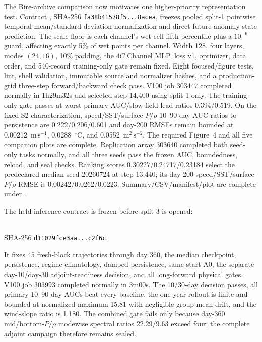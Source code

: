 \documentclass[11pt]{article}
\begin{document}
The Bire-archive comparison now motivates one higher-priority representation test.
Contract , SHA-256
\texttt{fa38b41578f5...8acea}, freezes pooled split-1 pointwise temporal
mean/standard-deviation normalization and direct future-anomaly-state prediction.
The scale floor is each channel's wet-cell fifth percentile plus a
\(10^{-6}\) guard, affecting exactly 5\% of wet points per channel.  Width 128,
four layers, modes \((24,16)\), 10\% padding, the \(4C\) Channel MLP, loss v1,
optimizer, data order, and 540-record training-only gate remain fixed.  Eight
focused/figure tests, lint, shell validation, immutable source and normalizer hashes,
and a production-grid three-step forward/backward check pass.  V100 job 303447
completed normally in 1h29m32s and selected step 14,400 using split 1 only.  The
training-only gate passes at worst primary AUC/slow-field-lead ratios 0.394/0.519.
On the fixed S2 characterization, speed/SST/surface-\(P/\rho\) 10--90-day AUC
ratios to persistence are 0.222/0.206/0.601 and day-200 RMSEs remain bounded at
0.00212~\(\mathrm{m\,s^{-1}}\), 0.0288~\({}^{\circ}\mathrm{C}\), and
0.0552~\(\mathrm{m^2\,s^{-2}}\).  The required Figure~4 and all five companion
plots are complete.  Replication array 303640 completed both seed-only tasks normally,
and all three seeds pass the frozen AUC, boundedness, reload, and seal checks.  Ranking
scores 0.30227/0.24717/0.23184 select the predeclared median seed 20260724 at step
13,440; its day-200 speed/SST/surface-\(P/\rho\) RMSE is
0.00242/0.0262/0.0223.  Summary/CSV/manifest/plot are complete under
.

The held-inference contract is frozen before split 3 is opened:
\begin{center}
\\
SHA-256 \texttt{d11029fce3aa...c2f6c}.
\end{center}
It fixes 45 fresh-block trajectories through day 360, the median checkpoint,
persistence, regime climatology, damped persistence, same-start A0, the separate
day-10/day-30 adjoint-readiness decision, and all long-forward physical gates.
V100 job 303993 completed normally in 3m00s.  The 10/30-day decision passes,
all primary 10--90-day AUCs beat every baseline, the one-year rollout is finite
and bounded at normalized maximum 15.81 with negligible group-mean drift, and
the wind-slope ratio is 1.180.  The combined gate fails only because day-360
mid/bottom-\(P/\rho\) modewise spectral ratios 22.29/9.63 exceed four; the
complete adjoint campaign therefore remains sealed.
\end{document}

